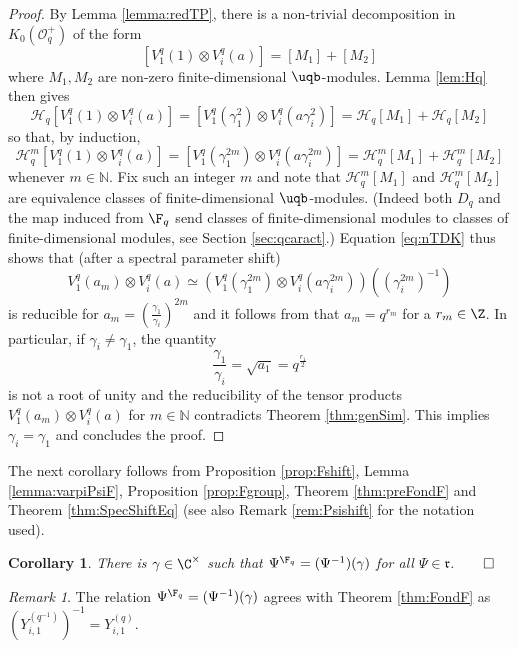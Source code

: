 \documentclass[11pt]{amsart}
\newtheorem{cor}[theorem]{Corollary}
\theoremstyle{definition}
\theoremstyle{remark}
\newtheorem{rem}[theorem]{Remark}
\numberwithin{equation}{section}
\begin{document}
\begin{proof} By Lemma \ref{lemma:redTP}, there is a non-trivial decomposition in $K_0(\mathcal{O}_q^+)$ of the form
$$ \textstyle [V_1^q(1)\otimes V_i^q(a)] = [M_1]+[M_2] $$
where $M_1,M_2$ are non-zero finite-dimensional $\uqb$-modules. Lemma \ref{lem:Hq} then gives
$$ \mathcal{H}_q[V_1^q(1)\otimes V_i^q(a)] =[V_1^q(\gamma_1^2)\otimes V_i^q(a\gamma_i^2)] = \mathcal{H}_q[M_1]+\mathcal{H}_q[M_2]$$
so that, by induction, 
\begin{equation}\label{eq:nTDK} 
\mathcal{H}_q^m[V_1^q(1)\otimes V_i^q(a)] =[V_1^q(\gamma_1^{2m})\otimes V_i^q(a\gamma_i^{2m})] = \mathcal{H}_q^m[M_1]+\mathcal{H}_q^m[M_2]
\end{equation}
whenever $m\in \mathbb{N}$. Fix such an integer $m$ and note that $\mathcal{H}_q^m[M_1]$ and $\mathcal{H}_q^m[M_2]$ are equivalence classes of finite-dimensional $\uqb$-modules. (Indeed both $D_{q}$ and the map induced from $\F_{q}$ send classes of finite-dimensional modules to classes of finite-dimensional modules, see Section \ref{sec:qcaract}.) Equation \eqref{eq:nTDK} thus shows that (after a spectral parameter shift)
$$V_1^q(a_m)\otimes V_i^q(a) \simeq (V_1^q(\gamma_1^{2m})\otimes V_i^q(a\gamma_i^{2m}))((\gamma_i^{2m})^{-1})$$
is reducible for $a_m = (\frac{\gamma_1}{\gamma_i})^{2m}$ and it follows from \cite[Proposition 6.15]{fm} that $a_m = q^{r_m}$ for a $r_m\in \Z$. In particular, if $\gamma_i\neq \gamma_1$, the quantity $$\textstyle \frac{\gamma_1}{\gamma_i} = \sqrt{a_1} = q^{\frac{r_1}{2}}$$ is not a root of unity and the reducibility of the tensor products $V_1^q(a_m)\otimes V_i^q(a)$ for $m\in \mathbb{N}$ contradicts Theorem \ref{thm:genSim}. This implies $\gamma_i=\gamma_1$ and concludes the proof.
\end{proof}
The next corollary follows from Proposition \ref{prop:Fshift}, Lemma \ref{lemma:varpiPsiF}, Proposition \ref{prop:Fgroup}, Theorem \ref{thm:preFondF} and Theorem \ref{thm:SpecShiftEq} (see also Remark \ref{rem:Psishift} for the notation used).
\begin{cor}\label{cor:F2} There is $\gamma\in \C^{\times}$ such that $\Psi^{\F_q} = (\Psi^{-1})(\gamma)$ for all $\Psi \in \mathfrak{r}$.\hfill $\qed$
\end{cor}
\begin{rem} The relation $\Psi^{\F_q} = (\Psi^{-1})(\gamma)$ agrees with Theorem \ref{thm:FondF} as $(Y_{i,1}^{(q^{-1})})^{-1} = Y_{i,1}^{(q)}$.
\end{rem}
\end{document}
